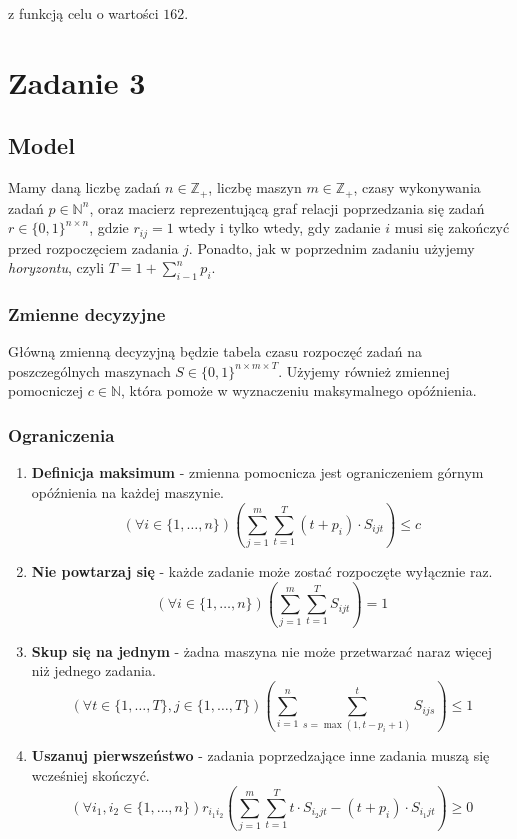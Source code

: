 \documentclass{article}
\theoremstyle{definition}
\theoremstyle{remark}
\theoremstyle{plain}
\theoremstyle{remark}
\theoremstyle{plain}
\begin{document}
z funkcją celu o wartości $162$.


\section{Zadanie 3}
\subsection{Model}
Mamy daną liczbę zadań $n\in\mathbb{Z}_+$, liczbę maszyn $m\in\mathbb{Z}_+$, czasy wykonywania zadań $p\in\mathbb{N}^n$, oraz macierz reprezentującą graf relacji poprzedzania się zadań $r\in\{0,1\}^{n\times n}$, gdzie $r_{ij}=1$ wtedy i tylko wtedy, gdy zadanie $i$ musi się zakończyć przed rozpoczęciem zadania $j$. Ponadto, jak w poprzednim zadaniu użyjemy \textit{horyzontu}, czyli $T=1+\sum_{i-1}^n{p_i}$.

\subsubsection{Zmienne decyzyjne}
Główną zmienną decyzyjną będzie tabela czasu rozpoczęć zadań na poszczególnych maszynach $S\in\{0,1\}^{n\times m\times T}$. Użyjemy również zmiennej pomocniczej $c\in\mathbb{N}$, która pomoże w wyznaczeniu maksymalnego opóźnienia.

\subsubsection{Ograniczenia}
\begin{enumerate}
    \item \textbf{Definicja maksimum} - zmienna pomocnicza jest ograniczeniem górnym opóźnienia na każdej maszynie.
    \[ (\forall i \in \{1,\dots,n\}) \left(\sum_{j=1}^{m}{\sum_{t=1}^T{(t+p_i)\cdot S_{ijt}}} \right) \leq c \]
    \item \textbf{Nie powtarzaj się} - każde zadanie może zostać rozpoczęte wyłącznie raz.
    \[ (\forall i \in \{1,\dots,n\}) \left(\sum_{j=1}^{m}{\sum_{t=1}^T{S_{ijt}}} \right) = 1 \]
    \item \textbf{Skup się na jednym} - żadna maszyna nie może przetwarzać naraz więcej niż jednego zadania.
    \[ (\forall t \in \{1,\dots,T\}, j\in\{1,\dots,T\}) \left(\sum_{i=1}^{n}{\sum_{s=\max(1,t-p_i+1)}^{t}{S_{ijs}}} \right) \leq 1 \]
    \item \textbf{Uszanuj pierwszeństwo} - zadania poprzedzające inne zadania muszą się wcześniej skończyć.
    \[ (\forall i_1,i_2 \in \{1,\dots,n\}) r_{i_1i_2}\left(\sum_{j=1}^{m}{\sum_{t=1}^T{t\cdot S_{i_2jt} - (t + p_i)\cdot S_{i_1jt}}} \right) \geq 0 \]
\end{enumerate}
\end{document}
